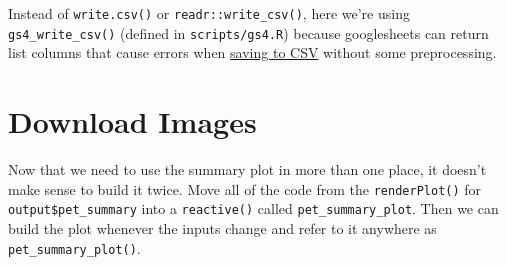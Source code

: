 \documentclass[
]{book}
\newenvironment{Shaded}{\begin{snugshade}}{\end{snugshade}}
\newcommand{\AttributeTok}[1]{\textcolor[rgb]{0.77,0.63,0.00}{#1}}
\newcommand{\CommentTok}[1]{\textcolor[rgb]{0.56,0.35,0.01}{\textit{#1}}}
\newcommand{\ControlFlowTok}[1]{\textcolor[rgb]{0.13,0.29,0.53}{\textbf{#1}}}
\newcommand{\DocumentationTok}[1]{\textcolor[rgb]{0.56,0.35,0.01}{\textbf{\textit{#1}}}}
\newcommand{\FunctionTok}[1]{\textcolor[rgb]{0.00,0.00,0.00}{#1}}
\newcommand{\NormalTok}[1]{#1}
\newcommand{\OtherTok}[1]{\textcolor[rgb]{0.56,0.35,0.01}{#1}}
\newcommand{\SpecialCharTok}[1]{\textcolor[rgb]{0.00,0.00,0.00}{#1}}
\newcommand{\StringTok}[1]{\textcolor[rgb]{0.31,0.60,0.02}{#1}}
\begin{document}
\begin{Shaded}
\end{Shaded}

Instead of \texttt{write.csv()} or \texttt{readr::write\_csv()}, here we're using \texttt{gs4\_write\_csv()} (defined in \texttt{scripts/gs4.R}) because googlesheets can return list columns that cause errors when \protect\hyperlink{gs4_save}{saving to CSV} without some preprocessing.

\hypertarget{download-images}{%
\section{Download Images}\label{download-images}}

Now that we need to use the summary plot in more than one place, it doesn't make sense to build it twice. Move all of the code from the \texttt{renderPlot()} for \texttt{output\$pet\_summary} into a \texttt{reactive()} called \texttt{pet\_summary\_plot}. Then we can build the plot whenever the inputs change and refer to it anywhere as \texttt{pet\_summary\_plot()}.

\begin{Shaded}
\end{Shaded}
\end{document}
